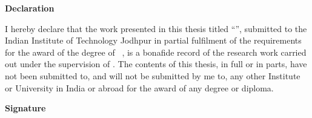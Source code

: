 

\begin{flushright}
\huge{ \textbf{Declaration}}
\end{flushright}
{ I hereby declare that the work presented in this thesis titled ``\emph{\ttitle{}}'', submitted to the Indian Institute of Technology Jodhpur in partial fulfilment of the requirements for the award of the degree of~ \degree, is a bonafide record of the research work carried out under the supervision of \supname. The contents of this thesis, in full or in parts, have not been submitted to, and will not be submitted by me to, any other Institute or University in India or abroad for the award of any degree or diploma.}
\vspace{2cm}
\begin{flushright}
\large{\textbf{Signature}}\\
\emph{\authorname}\\
\rn
\end{flushright}
